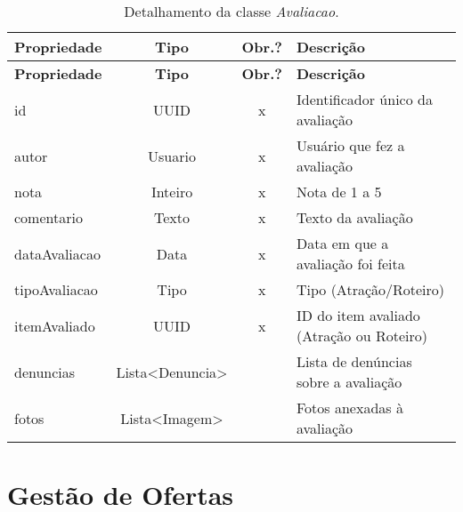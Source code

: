 \begin{longtable}{|p{3.5cm}|c|c|p{8cm}|}
    \caption{Detalhamento da classe \emph{Avaliacao}.}
    \label{tbl-dicionario-avaliacao} \\\hline 
    
    \rowcolor{lightgray}
    \textbf{Propriedade} & \textbf{Tipo} & \textbf{Obr.?} & \textbf{Descrição} \\\hline
    \endfirsthead
    \hline
    \rowcolor{lightgray}
    \textbf{Propriedade} & \textbf{Tipo} & \textbf{Obr.?} & \textbf{Descrição} \\\hline
    \endhead
    
    id & UUID & x & Identificador único da avaliação \\\hline
    autor & Usuario & x & Usuário que fez a avaliação \\\hline
    nota & Inteiro & x & Nota de 1 a 5 \\\hline
    comentario & Texto & x & Texto da avaliação \\\hline
    dataAvaliacao & Data & x & Data em que a avaliação foi feita \\\hline
    tipoAvaliacao & Tipo & x & Tipo (Atração/Roteiro) \\\hline
    itemAvaliado & UUID & x & ID do item avaliado (Atração ou Roteiro) \\\hline
    denuncias & Lista<Denuncia> & & Lista de denúncias sobre a avaliação \\\hline
    fotos & Lista<Imagem> & & Fotos anexadas à avaliação \\\hline
\end{longtable}

\section{Gestão de Ofertas}
\label{sec-dicionario-ofertas}

